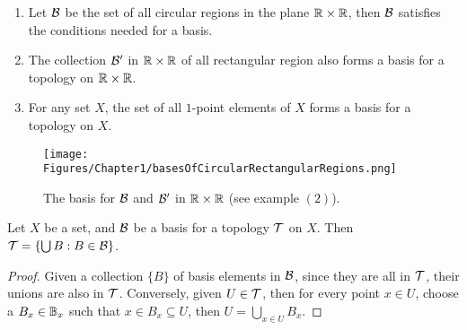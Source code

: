 \begin{example}
    \begin{enumerate}[label=(\arabic*)]
        \item Let $\mathcal{B}$ be the set of all circular regions in the plane  $\mathbb{R} \times \mathbb{R}$, then 
            $\mathcal{B}$ satisfies the conditions needed for a basis.

        \item The collection  $\mathcal{B}'$ in  $\mathbb{R} \times \mathbb{R}$ of all rectangular region also 
            forms a basis for a topology on  $\mathbb{R} \times \mathbb{R}$.

        \item For any set  $X$, the set of all  $1$-point elements of  $X$ forms a 
            basis for a topology on  $X$.
    \end{enumerate}		
\end{example}

\begin{figure}
    \centering
    \texttt{[image: Figures/Chapter1/basesOfCircularRectangularRegions.png]}
    \caption{The basis for $\mathcal{B}$ and  $\mathcal{B}'$ in  $\mathbb{R} \times \mathbb{R}$  (see example $(2)$).}
    \label{fig_1.2}
\end{figure}

\begin{lemma}\label{1.2.2}
    Let $X$ be a set, and  $\mathcal{B}$ be a basis for a topology  $\mathcal{T}$ on  $X$. Then 
    $\mathcal{T}=\{\bigcup{B}: B \in \mathcal{B}\}$.
\end{lemma}
\begin{proof}
    Given a collection $\{B\}$ of basis elements in  $\mathcal{B}$, since they are all in  $\mathcal{T}$, 
    their unions are also in $\mathcal{T}$. Conversely, given  $U \in \mathcal{T}$, then for every point 
    $x \in U$, choose a  $B_x \in \mathbb{B}_x$ such that  $x \in B_x \subseteq U$, then  $U=\bigcup_{x \in U}{B_x}$.
\end{proof}
